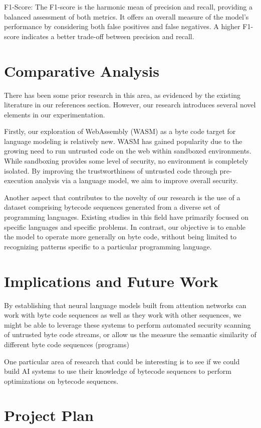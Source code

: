 \documentclass{article}
\begin{document}
F1-Score: The F1-score is the harmonic mean of precision and recall, providing a balanced assessment of both metrics. It offers an overall measure of the model's performance by considering both false positives and false negatives. A higher F1-score indicates a better trade-off between precision and recall.

\section{Comparative Analysis}
There has been some prior research in this area, as evidenced by the existing literature in our references section. However, our research introduces several novel elements in our experimentation.

Firstly, our exploration of WebAssembly (WASM) as a byte code target for language modeling is relatively new. WASM has gained popularity due to the growing need to run untrusted code on the web within sandboxed environments. While sandboxing provides some level of security, no environment is completely isolated. By improving the trustworthiness of untrusted code through pre-execution analysis via a language model, we aim to improve overall security.

Another aspect that contributes to the novelty of our research is the use of a dataset comprising bytecode sequences generated from a diverse set of programming languages. Existing studies in this field have primarily focused on specific languages and specific problems. In contrast, our objective is to enable the model to operate more generally on byte code, without being limited to recognizing patterns specific to a particular programming language.

\section{Implications and Future Work}
By establishing that neural language models built from attention networks can work with byte code sequences as well as they work with other sequences, we might be able to leverage these systems to perform automated security scanning of untrusted byte code streams, or allow us the measure the semantic similarity of different byte code sequences (programs)

One particular area of research that could be interesting is to see if we could build AI systems to use their knowledge of bytecode sequences to perform optimizations on bytecode sequences.

\section{Project Plan}
\end{document}

